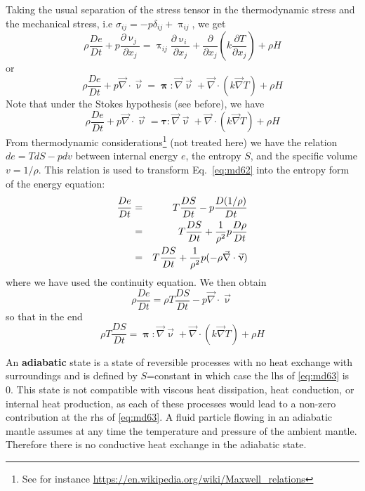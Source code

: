 Taking the usual separation of the stress tensor in the thermodynamic stress and the
mechanical stress, i.e $\sigma_{ij} = -p \delta_{ij} + \uppi_{ij}$, we get
\begin{equation}
\rho \frac{De}{Dt} + p \frac{\partial \upnu_j}{\partial x_j} 
= \uppi_{ij} \frac{\partial \upnu_i}{\partial x_j} + 
\frac{\partial }{\partial x_j} (k \frac{\partial T}{\partial x_j}) + \rho H
\label{eq:md62}
\end{equation}
or
\[
\rho \frac{De}{Dt} + p \vec\nabla \cdot \vec\upnu 
= {\bm \uppi} : \vec\nabla\vec\upnu  
+\vec\nabla \cdot (k \vec\nabla T) + \rho H
\]
Note that under the Stokes hypothesis (see before), we have
\[
\rho \frac{De}{Dt} + p \vec\nabla \cdot \vec\upnu 
= {\bm \tau} : \vec\nabla\vec\upnu  
+\vec\nabla \cdot (k \vec\nabla T) + \rho H
\]
From thermodynamic considerations\footnote{See for 
instance \url{https://en.wikipedia.org/wiki/Maxwell_relations}} 
(not treated here) we have the relation
$de=TdS-p dv$ between internal energy $e$, the entropy $S$, 
and the specific volume $v=1/\rho$. 
This relation is used to transform Eq.~\eqref{eq:md62} into 
the entropy form of the energy equation:
\begin{eqnarray}
\frac{De}{Dt} 
&=& T \frac{DS}{Dt} - p \frac{D(1/\rho)}{Dt} \nonumber\\
&=& T \frac{DS}{Dt} + \frac{1}{\rho^2} p \frac{D \rho}{Dt} \nonumber\\
&=& T \frac{DS}{Dt} + \frac{1}{\rho^2} p (-\rho \vec\nabla\cdot \vec\upnu) 
\end{eqnarray}
where we have used the continuity equation. We then obtain
\[
\rho \frac{De}{Dt} 
=
\rho T \frac{DS}{Dt} -  p \vec\nabla\cdot \vec\upnu 
\]
so that in the end
\begin{equation}
\rho T \frac{DS}{Dt} = 
{\bm \uppi}: \vec\nabla\vec\upnu + 
\vec\nabla \cdot (k \vec\nabla T) + \rho H
\label{eq:md63}
\end{equation}

An {\bf adiabatic} state is a state of reversible processes with no 
heat exchange with surroundings and is defined by $S$=constant in which 
case the lhs of \eqref{eq:md63} is 0. This state is
not compatible with viscous heat dissipation, heat conduction, or 
internal heat production, as each of these processes would lead to a 
non-zero contribution at the rhs of \eqref{eq:md63}. 
A fluid particle flowing in an adiabatic mantle assumes at any time 
the temperature and pressure
of the ambient mantle. Therefore there is no conductive heat exchange 
in the adiabatic state.

